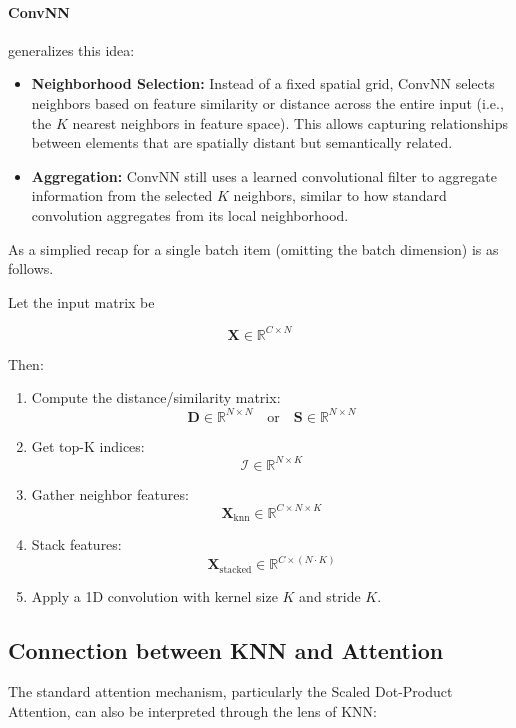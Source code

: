 \documentclass{article}
\begin{document}
\paragraph{ConvNN} generalizes this idea: 

\begin{itemize}
    \item \textbf{Neighborhood Selection:} Instead of a fixed spatial grid, ConvNN selects neighbors based on feature similarity or distance across the entire input (i.e., the \(K\) nearest neighbors in feature space). This allows capturing relationships between elements that are spatially distant but semantically related. 
    \item \textbf{Aggregation:} ConvNN still uses a learned convolutional filter to aggregate information from the selected \(K\) neighbors, similar to how standard convolution aggregates from its local neighborhood. 
\end{itemize}

As a simplied recap for a single batch item (omitting the batch dimension) is as follows.

Let the input matrix be 

\[
    \mathbf{X} \in \mathbb{R}^{C \times N}
\]

Then: 

\begin{enumerate}
    \item Compute the distance/similarity matrix: 
    \[
        \mathbf{D} \in \mathbb{R}^{N \times N} \quad \text{or} \quad \mathbf{S} \in \mathbb{R}^{N \times N}
    \]
    \item Get top-K indices: 
    \[
        \mathcal{I} \in \mathbb{R}^{N \times K}
    \]
    \item Gather neighbor features: 
    \[
        \mathbf{X}_{\text{knn}} \in \mathbb{R}^{C \times N \times K}
    \]
    \item Stack features: 
    \[
        \mathbf{X}_{\text{stacked}} \in \mathbb{R}^{C \times (N \cdot K)}
    \]
    \item Apply a 1D convolution with kernel size \(K\) and stride \(K\).
\end{enumerate}

\subsection{Connection between KNN and Attention}
The standard attention mechanism, particularly the Scaled Dot-Product Attention, can also be interpreted through the lens of KNN: 
\end{document}
